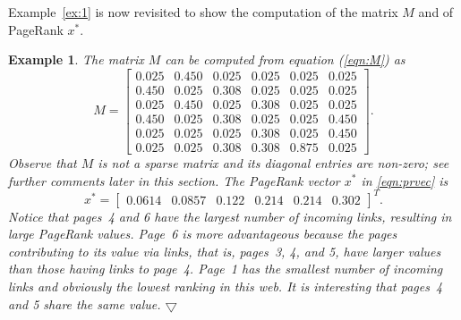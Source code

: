 \documentclass[11pt,draftcls,onecolumn]{IEEEtran}
\newtheorem{example}[theorem]{Example}
\newcommand{\End}{\hfill \mbox{$\bigtriangledown$}}
\begin{document}
Example~\ref{ex:1} is now revisited to show the computation 
of the matrix $M$ and of PageRank $x^*$.

\begin{example}\label{ex:2}\rm
The matrix $M$ can be computed from equation (\ref{eqn:M}) as
\begin{equation*}
 M = \begin{bmatrix}
       0.025 &   0.450  & 0.025 & 0.025 & 0.025 & 0.025\\
       0.450  &   0.025 & 0.308 & 0.025 & 0.025 & 0.025\\
       0.025 &   0.450  & 0.025 & 0.308 & 0.025 & 0.025\\
       0.450  &   0.025 & 0.308 & 0.025 & 0.025 & 0.450\\
       0.025 &   0.025 & 0.025 & 0.308 & 0.025 & 0.450\\
       0.025 &   0.025 & 0.308 & 0.308 & 0.875 & 0.025
     \end{bmatrix}.
\label{eqn:ex:origM}
\end{equation*}
Observe that $M$ is not a sparse matrix and its diagonal entries are non-zero; 
see further comments later in this section.
The PageRank vector $x^*$ in \eqref{eqn:prvec} is
\begin{equation}
  x^* = \begin{bmatrix}
           0.0614 & 0.0857 & 0.122 & 0.214 & 0.214 & 0.302
        \end{bmatrix}^T.
\label{eqn:ex:x_ast}        
\end{equation}
Notice that pages~4 and 6 have the largest number of incoming links,
resulting in large PageRank values.
Page~6 is more advantageous because the pages contributing to its value
via links, that is, pages~3, 4, and 5, 
have larger values than those having links to page~4. 
Page~1 has the smallest number
of incoming links and obviously the lowest ranking in this web. 
It is interesting that pages~4 and 5 share the same value. 
\End
\end{example}

\vspace{.5cm}
\end{document}
